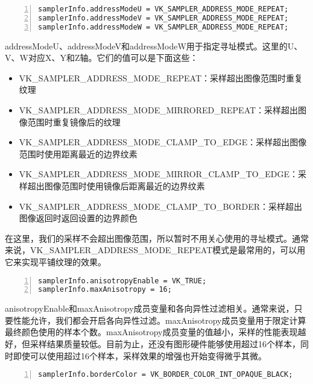 \documentclass{ctexart}
\begin{document}
\begin{lstlisting}[language={[ANSI]C},keywordstyle=\color{blue!70},commentstyle=\color{red!50!green!50!blue!50},frame=shadowbox, rulesepcolor=\color{red!20!green!20!blue!20},basicstyle=\small,numbers=left, numberstyle=\tiny,breaklines=true]
samplerInfo.addressModeU = VK_SAMPLER_ADDRESS_MODE_REPEAT;
samplerInfo.addressModeV = VK_SAMPLER_ADDRESS_MODE_REPEAT;
samplerInfo.addressModeW = VK_SAMPLER_ADDRESS_MODE_REPEAT;
\end{lstlisting}

addressModeU、addressModeV和addressModeW用于指定寻址模式。这里的U、V、W对应X、Y和Z轴。它们的值可以是下面这些：

\begin{itemize}
	\item VK\_SAMPLER\_ADDRESS\_MODE\_REPEAT：采样超出图像范围时重复纹理
	\item VK\_SAMPLER\_ADDRESS\_MODE\_MIRRORED\_REPEAT：采样超出图像范围时重复镜像后的纹理
	\item VK\_SAMPLER\_ADDRESS\_MODE\_CLAMP\_TO\_EDGE：采样超出图像范围时使用距离最近的边界纹素
	\item VK\_SAMPLER\_ADDRESS\_MODE\_MIRROR\_CLAMP\_TO\_EDGE：采样超出图像范围时使用镜像后距离最近的边界纹素
	\item VK\_SAMPLER\_ADDRESS\_MODE\_CLAMP\_TO\_BORDER：采样超出图像返回时返回设置的边界颜色
\end{itemize}

在这里，我们的采样不会超出图像范围，所以暂时不用关心使用的寻址模式。通常来说，VK\_SAMPLER\_ADDRESS\_MODE\_REPEAT模式是最常用的，可以用它来实现平铺纹理的效果。

\begin{lstlisting}[language={[ANSI]C},keywordstyle=\color{blue!70},commentstyle=\color{red!50!green!50!blue!50},frame=shadowbox, rulesepcolor=\color{red!20!green!20!blue!20},basicstyle=\small,numbers=left, numberstyle=\tiny,breaklines=true]
samplerInfo.anisotropyEnable = VK_TRUE;
samplerInfo.maxAnisotropy = 16;
\end{lstlisting}

anisotropyEnable和maxAnisotropy成员变量和各向异性过滤相关。通常来说，只要性能允许，我们都会开启各向异性过滤。maxAnisotropy成员变量用于限定计算最终颜色使用的样本个数。maxAnisotropy成员变量的值越小，采样的性能表现越好，但采样结果质量较低。目前为止，还没有图形硬件能够使用超过16个样本，同时即使可以使用超过16个样本，采样效果的增强也开始变得微乎其微。

\begin{lstlisting}[language={[ANSI]C},keywordstyle=\color{blue!70},commentstyle=\color{red!50!green!50!blue!50},frame=shadowbox, rulesepcolor=\color{red!20!green!20!blue!20},basicstyle=\small,numbers=left, numberstyle=\tiny,breaklines=true]
samplerInfo.borderColor = VK_BORDER_COLOR_INT_OPAQUE_BLACK;
\end{lstlisting}
\end{document}
